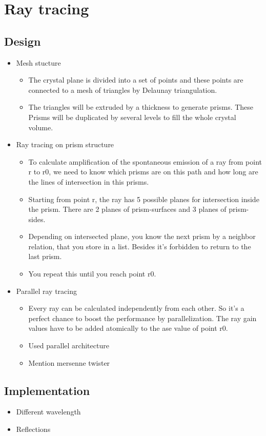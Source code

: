 \section{Ray tracing}
\subsection{Design}
\begin{itemize}
\item Mesh stucture
  \begin{itemize}
  \item The crystal plane is divided into a set of points and 
    these points are connected to a mesh of triangles by 
    Delaunay triangulation.
  \item The triangles will be extruded by a thickness to generate prisms.
    These Prisms will be duplicated by several levels to fill the 
    whole crystal volume.			  
  \end{itemize}
\item Ray tracing on prism structure
  \begin{itemize}
  \item To calculate amplification of the spontaneous emission of a ray from
    point r to r0, we need to know which prisms are on this path and how
    long are the lines of intersection in this prisms.
  \item Starting from point r, the ray has 5 possible planes for 
    intersection inside the prism. There are 2 planes of prism-surfaces
    and 3 planes of prism-sides.
  \item Depending on intersected plane, you know the next prism by a neighbor
    relation, that you store in a list. Besides it's forbidden to return 
    to the last prism.
  \item You repeat this until you reach point r0.
    
  \end{itemize}
\item Parallel ray tracing
  \begin{itemize}
  \item Every ray can be calculated independently from each other. So it's
    a perfect chance to boost the performance by parallelization. 
    The ray gain values have to be added atomically to the ase value
    of point r0.
  \item Used parallel architecture
  \item Mention mersenne twister
  \end{itemize}
\end{itemize}
\subsection{Implementation}
\begin{itemize}
\item Different wavelength
\item Reflections
\end{itemize}
